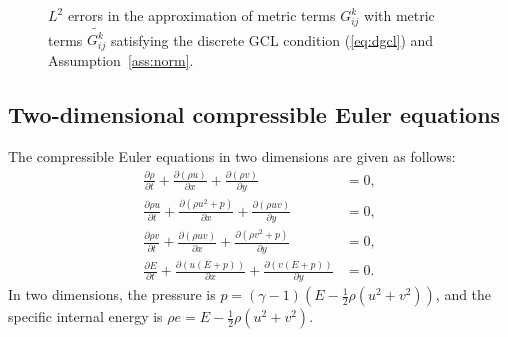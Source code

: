 \documentclass[10pt]{amsart}
\newcommand{\logLogSlopeTriangleFlip}[5]
{

    \pgfplotsextra
    {
        \pgfkeysgetvalue{/pgfplots/xmin}{\xmin}
        \pgfkeysgetvalue{/pgfplots/xmax}{\xmax}
        \pgfkeysgetvalue{/pgfplots/ymin}{\ymin}
        \pgfkeysgetvalue{/pgfplots/ymax}{\ymax}

        \pgfmathsetmacro{\xBrel}{#1-#2}
        \pgfmathsetmacro{\yBrel}{#3}
        \pgfmathsetmacro{\xCrel}{#1}

        \pgfmathsetmacro{\lnxB}{\xmin*(1-(#1-#2))+\xmax*(#1-#2)} %
        \pgfmathsetmacro{\lnxA}{\xmin*(1-#1)+\xmax*#1} %
        \pgfmathsetmacro{\lnyA}{\ymin*(1-#3)+\ymax*#3} %
        \pgfmathsetmacro{\lnyC}{\lnyA+#4*(\lnxA-\lnxB)}
        \pgfmathsetmacro{\yCrel}{\lnyC-\ymin)/(\ymax-\ymin)} %

	\pgfmathsetmacro{\xArel}{\xBrel}
        \pgfmathsetmacro{\yArel}{\yCrel}

        \coordinate (A) at (rel axis cs:\xArel,\yArel);
        \coordinate (B) at (rel axis cs:\xBrel,\yBrel);
        \coordinate (C) at (rel axis cs:\xCrel,\yCrel);

        \draw[#5]   (A)-- node[pos=0.5,anchor=east] {#4}
                    (B)-- 
                    (C)-- node[pos=0.5,anchor=south] {}
                    cycle;
    }
}
\theoremstyle{definition}
\theoremstyle{lemma}
\theoremstyle{theorem}
\theoremstyle{assumption}
\renewcommand{\tilde}{\widetilde}
\newcommand{\pd}[2]{\frac{\partial#1}{\partial#2}}
\newcommand{\LRp}[1]{\left( #1 \right)}
\begin{document}
{\begin{figure}
{
}
\caption{$L^2$ errors in the approximation of metric terms $G^k_{ij}$ with metric terms $\tilde{G^k_{ij}}$ satisfying the discrete GCL condition (\ref{eq:dgcl}) and Assumption~\ref{ass:norm}.}
\label{fig:geomerr}
\end{figure}

\subsection{Two-dimensional compressible Euler equations}

The compressible Euler equations in two dimensions are given as follows:
\begin{align}
\pd{\rho}{t} + \pd{\LRp{\rho u}}{x} + \pd{\LRp{\rho v}}{y} &= 0,\\
\pd{\rho u}{t} + \pd{\LRp{\rho u^2 + p }}{x} + \pd{\LRp{\rho uv}}{y} &= 0,\nonumber\\
\pd{\rho v}{t} + \pd{\LRp{\rho uv}}{x} + \pd{\LRp{\rho v^2 + p }}{y} &= 0,\nonumber\\
\pd{E}{t} + \pd{\LRp{u(E+p)}}{x} + \pd{\LRp{v(E+p)}}{y}&= 0.\nonumber
\end{align}
In two dimensions, the pressure is $p = (\gamma-1)\LRp{E - \frac{1}{2}\rho (u^2+v^2)}$, and the specific internal energy is $\rho e = E - \frac{1}{2}\rho (u^2+v^2)$.  

}
\end{document}
